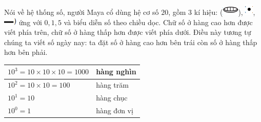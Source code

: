 	Nói về hệ thống số,  người Maya  cổ dùng hệ cơ số $20$, gồm $3$ kí hiệu:  (\includegraphics{29}),  \includegraphics{30}, \includegraphics{31}  ứng với $0,1, 5$ và biểu diễn số theo chiều dọc. Chữ số ở hàng cao hơn được viết phía trên, chữ số ở hàng thấp hơn được viết phía dưới. Điều này tương tự chúng ta viết số ngày nay: ta đặt số ở hàng cao hơn bên trái còn số ở hàng thấp hơn bên phải. 
	\begin{table}[H]
		\vspace*{-5pt}
		\centering
		\setlength{\tabcolsep}{4.5pt}
		\renewcommand{\arraystretch}{1.3}
		\begin{tabular}{|l|l|}
			\hline
			$10^3 = 10\!\times\! 10 \!\times\! 10 =1000$& hàng nghìn\\
			\hline
			$10^2 = 10\!\times\! 10 =100$& hàng trăm\\
			\hline
			$10^1 = 10$& hàng chục\\
			\hline
			$10^0 = 1$& hàng đơn vị\\
			\hline
		\end{tabular}
	\end{table}
